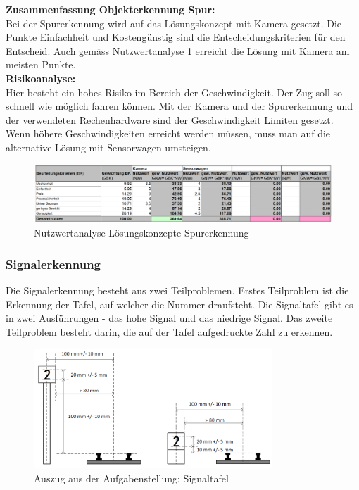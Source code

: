 \documentclass[../../../main.tex]{subfiles}
\begin{document}
    \textbf{Zusammenfassung Objekterkennung Spur:}\\
    Bei der Spurerkennung wird auf das Lösungskonzept mit Kamera gesetzt. Die Punkte Einfachheit und Kostengünstig sind die Entscheidungskriterien für den Entscheid. Auch gemäss Nutzwertanalyse \ref{fig:nutzwer_spur} erreicht die Lösung mit Kamera am meisten Punkte.\\
    \textbf{Risikoanalyse:}\\
    Hier besteht ein hohes Risiko im Bereich der Geschwindigkeit. Der Zug soll so schnell wie möglich fahren können. Mit der Kamera und der Spurerkennung und der verwendeten Rechenhardware sind der Geschwindigkeit Limiten gesetzt. Wenn höhere Geschwindigkeiten erreicht werden müssen, muss man auf die alternative Lösung mit Sensorwagen umsteigen.\\

    \begin{figure}[H]
        \centering
        \includegraphics[width=1\textwidth]{Nutzwert_Spur.png}
        \caption{Nutzwertanalyse Lösungskonzepte Spurerkennung}
        \label{fig:nutzwer_spur}
    \end{figure}

    \subsubsection{Signalerkennung}
    Die Signalerkennung besteht aus zwei Teilproblemen. Erstes Teilproblem ist die Erkennung der Tafel, 
    auf welcher die Nummer draufsteht. Die Signaltafel gibt es in zwei Ausführungen - das hohe Signal und das 
    niedrige Signal. Das zweite Teilproblem besteht darin, die auf der Tafel aufgedruckte Zahl zu erkennen.\\

    \begin{figure}[H]
        \includegraphics[width=0.8\textwidth]{Signal.png}
        \caption{Auszug aus der Aufgabenstellung: Signaltafel}
    \end{figure}
\end{document}

